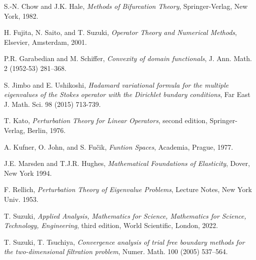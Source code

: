 \documentclass[final,a4paper]{jmsj}
\theoremstyle{thmstyleone}%
\theoremstyle{thmstyletwo}%
\theoremstyle{thmstylethree}%
\begin{document}
\begin{thebibliography}{9}

S.-N. Chow and J.K. Hale, {\it Methods of Bifurcation Theory}, Springer-Verlag, New York, 1982. 


H. Fujita, N. Saito, and T. Suzuki, {\it Operator Theory and Numerical Methods}, Elsevier, Amsterdam, 2001. 


P.R. Garabedian and M. Schiffer, {\it Convexity of domain functionals}, J. Ann. Math. 2  (1952-53) 281--368. 


S. Jimbo and E. Ushikoshi, {\it Hadamard variational formula for the multiple eigenvalues of the Stokes operator with the Dirichlet bundary conditions}, Far East J. Math. Sci. 98 (2015) 713-739. 

T. Kato, {\it Perturbation Theory for Linear Operators}, second edition, Springer-Verlag, Berlin, 1976. 

A. Kufner, O. John, and S. Fu\v{c}ik, {\it Funtion Spaces}, Academia, Prague, 1977. 

J.E. Marsden and T.J.R. Hughes, {\it Mathematical Foundations of Elasticity}, Dover, New York 1994. 

F. Rellich, {\it Perturbation Theory of Eigenvalue Problems}, Lecture Notes, New York Univ. 1953. 




T. Suzuki, 
{\it Applied Analysis, Mathematics for Science, Mathematics for Science, Technology, Engineering}, third edition, World Scientific, London, 2022. 

T. Suzuki, T. Tsuchiya,
{\it Convergence analysis of trial free boundary methods for the two-dimensional filtration problem},
Numer. Math. 100 (2005) 537--564. 



\end{thebibliography}
\end{document}
